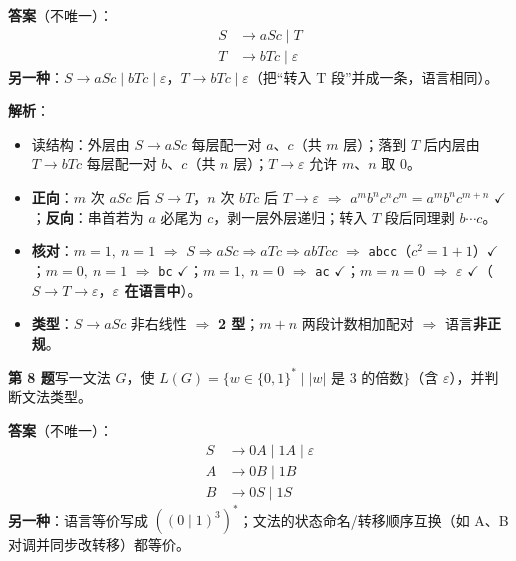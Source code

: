 \documentclass[12pt,a4paper,fontset=windows]{ctexart}
\newcommand{\ok}{\ensuremath{\checkmark}}
\newcommand{\imp}{\ensuremath{\Rightarrow}}
\begin{document}
\textbf{答案}（不唯一）：
\[
\begin{aligned}
S &\to aSc \mid T\\
T &\to bTc \mid \varepsilon
\end{aligned}
\]
\textbf{另一种}：$S \to aSc \mid bTc \mid \varepsilon$，$T \to bTc \mid \varepsilon$（把``转入 T 段''并成一条，语言相同）。

\textbf{解析}：
\begin{itemize}
\item 读结构：外层由 $S \to aSc$ 每层配一对 $a$、$c$（共 $m$ 层）；落到 $T$ 后内层由 $T \to bTc$ 每层配一对 $b$、$c$（共 $n$ 层）；$T \to \varepsilon$ 允许 $m$、$n$ 取 $0$。
\item \textbf{正向}：$m$ 次 $aSc$ 后 $S \to T$，$n$ 次 $bTc$ 后 $T \to \varepsilon$ \imp{} $a^m b^n c^{n} c^{m} = a^m b^n c^{m+n}$ \ok；\textbf{反向}：串首若为 $a$ 必尾为 $c$，剥一层外层递归；转入 $T$ 段后同理剥 $b \cdots c$。
\item \textbf{核对}：$m=1,\ n=1$ \imp{} $S \Rightarrow aSc \Rightarrow aTc \Rightarrow abTcc$ \imp{} \texttt{abcc}（$c^2 = 1+1$）\ok；$m=0,\ n=1$ \imp{} \texttt{bc} \ok；$m=1,\ n=0$ \imp{} \texttt{ac} \ok；$m=n=0$ \imp{} \textbf{$\varepsilon$} \ok（$S \to T \to \varepsilon$，\textbf{$\varepsilon$ 在语言中}）。
\item \textbf{类型}：$S \to aSc$ 非右线性 \imp{} \textbf{2 型}；$m+n$ 两段计数相加配对 \imp{} 语言\textbf{非正规}。
\end{itemize}

\begin{qbox}
{\large\bfseries 第 8 题}\quad 写一文法 $G$，使 $L(G)=\{w \in \{0,1\}^* \mid |w| \text{ 是 3 的倍数}\}$（含 $\varepsilon$），并判断文法类型。
\end{qbox}

\textbf{答案}（不唯一）：
\[
\begin{aligned}
S &\to 0A \mid 1A \mid \varepsilon\\
A &\to 0B \mid 1B\\
B &\to 0S \mid 1S
\end{aligned}
\]
\textbf{另一种}：语言等价写成 $((0 \mid 1)^3)^*$；文法的状态命名/转移顺序互换（如 A、B 对调并同步改转移）都等价。
\end{document}
